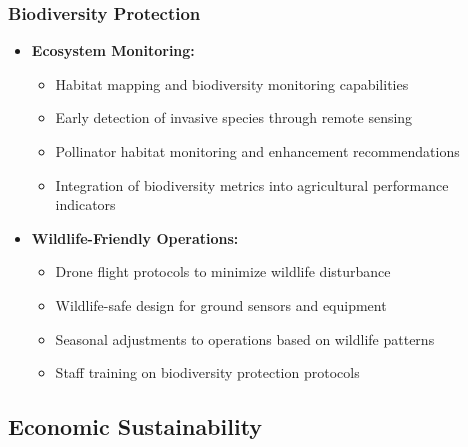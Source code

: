 \subsubsection{Biodiversity Protection}
\begin{itemize}
    \item \textbf{Ecosystem Monitoring:}
    \begin{itemize}
        \item Habitat mapping and biodiversity monitoring capabilities
        \item Early detection of invasive species through remote sensing
        \item Pollinator habitat monitoring and enhancement recommendations
        \item Integration of biodiversity metrics into agricultural performance indicators
    \end{itemize}
    
    \item \textbf{Wildlife-Friendly Operations:}
    \begin{itemize}
        \item Drone flight protocols to minimize wildlife disturbance
        \item Wildlife-safe design for ground sensors and equipment
        \item Seasonal adjustments to operations based on wildlife patterns
        \item Staff training on biodiversity protection protocols
    \end{itemize}
\end{itemize}

\subsection{Economic Sustainability}

